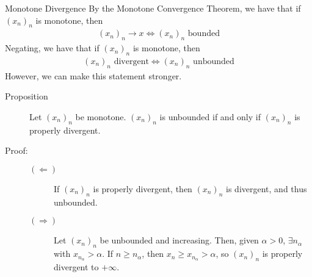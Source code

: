 \documentclass[10pt]{extarticle}
\begin{document}
  \begin{problem}{Monotone Divergence}
    By the Monotone Convergence Theorem, we have that if $(x_n)_n$ is monotone, then
    \begin{align*}
      (x_n)_n\rightarrow x \Leftrightarrow (x_n)_n \text{ bounded}
    \end{align*}
    Negating, we have that if $(x_n)_n$ is monotone, then
    \begin{align*}
      (x_n)_n\text{ divergent} \Leftrightarrow (x_n)_n \text{ unbounded}
    \end{align*}
    However, we can make this statement stronger.
    \begin{description}
      \item[Proposition] Let $(x_n)_n$ be monotone. $(x_n)_n$ is unbounded if and only if $(x_n)_n$ is properly divergent.
      \item[Proof:] \hfill
        \begin{description}
          \item[$(\Leftarrow)$] If $(x_n)_n$ is properly divergent, then $(x_n)_n$ is divergent, and thus unbounded.
          \item[$(\Rightarrow)$] Let $(x_n)_n$ be unbounded and increasing. Then, given $\alpha > 0$, $\exists n_{\alpha}$ with $x_{n_\alpha} > \alpha$. If $n \geq n_{\alpha}$, then $x_{n} \geq x_{n_{\alpha}} > \alpha$, so $(x_n)_n$ is properly divergent to $+\infty$.
        \end{description}
    \end{description}
  \end{problem}
\end{document}
